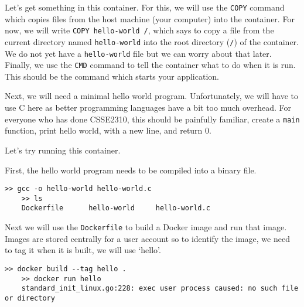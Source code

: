 Let's get something in this container.
For this, we will use the \texttt{COPY} command which copies files from the host machine (your computer) into the container.
For now, we will write \texttt{COPY hello-world /}, which says to copy a file from the current directory named \texttt{hello-world} into the root directory (\texttt{/})
of the container.
We do not yet have a \texttt{hello-world} file but we can worry about that later.
Finally, we use the \texttt{CMD} command to tell the container what to do when it is run.
This should be the command which starts your application.

\begin{shaded*}

\end{shaded*}


Next, we will need a minimal hello world program.
Unfortunately, we will have to use C here as better programming languages have a bit too much overhead.
For everyone who has done CSSE2310, this should be painfully familiar, create a \texttt{main} function, print hello world, with a new line, and return 0.

\begin{shaded*}

\end{shaded*}

Let's try running this container.

First, the hello world program needs to be compiled into a binary file.

\begin{shaded*}
\begin{lstlisting}[language=shell]
    >> gcc -o hello-world hello-world.c
    >> ls
    Dockerfile      hello-world     hello-world.c
\end{lstlisting}
\end{shaded*}

Next we will use the \texttt{Dockerfile} to build a Docker image and run that image.
Images are stored centrally for a user account so to identify the image, we need to tag it when it is built, we will use `hello'.

\begin{shaded*}
\begin{lstlisting}[language=shell]
    >> docker build --tag hello .
    >> docker run hello
    standard_init_linux.go:228: exec user process caused: no such file or directory
\end{lstlisting}
\end{shaded*}

